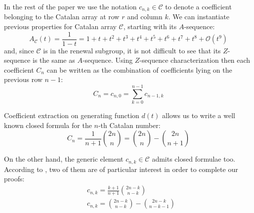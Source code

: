 In the rest of the paper we use the notation $c_{n,k}\in\mathcal{C}$ to denote
a coefficient belonging to the Catalan array at row $r$ and column $k$.
We can instantiate previous properties for Catalan array $\mathcal{C}$, starting with its $A$-sequence:
\begin{displaymath}
    A_{\mathcal{C}}(t)=\frac{1}{1-t}=1+t+t^{2}+t^{3}+t^{4}+t^{5}+t^{6}+t^{7}+t^{8}+
        \mathcal{O}(t^{9})
\end{displaymath}
and, since $\mathcal{C}$ is in the renewal subgroup, it is not difficult to see that its
$Z$-sequence is the same as $A$-sequence. Using $Z$-sequence characterization then 
each coefficient $C_{n}$ can be written as the combination of coefficients 
lying on the previous row $n-1$:
\begin{displaymath}
    C_{n} = c_{n,0} = \sum_{k=0}^{n-1}{c_{n-1,k}}
\end{displaymath}
\iffalse
in other words, $C_{n}$ equals the $(n-1)$-row sum of $\mathcal{C}$, 
therefore by the fundamental theorem:
\begin{displaymath}
    C_{n} = [t^{n-1}]\mathcal{C}\,A_{\mathcal{C}}(t)
          = [t^{n-1}]d(t)\,A_{\mathcal{C}}(h(t))
          = [t^{n}]h(t)\,A_{\mathcal{C}}(h(t))
\end{displaymath}
yielding:
\begin{displaymath}
    C_{n} = [t^{n}]\frac{1-\sqrt{1-4 \, t}}{1+\sqrt{1-4 \, t}}
\end{displaymath}
for $n>0$ and boundary condition $C_{0}=1$. 
Moreover, from the above equation, it is possible to derive
another generating function for the sequence of Catalan numbers:
\begin{displaymath}
    \frac{1-\sqrt{1-4 \, t}}{1+\sqrt{1-4 \, t}}=
    \frac{\left(1-\sqrt{1-4 \, t}\right)^{2}}{4 \, t}=
    \frac{1-2\,t-\sqrt{1-4 \, t}}{2 \, t}
\end{displaymath}
\fi
Coefficient extraction on generating function $d(t)$ allows us to write 
a well known closed formula for the $n$-th Catalan number:
\begin{equation}
    C_{n} = \frac{1}{n+1}{{2n}\choose{n}} 
        = {{2n}\choose{n}} - {{2n}\choose{n+1}}
    \label{eq:catalan:coeff:rewriting}
\end{equation}

On the other hand, the generic element $c_{n,k}\in\mathcal{C}$ 
admits closed formulae too. According to
\cite{luzon:2012631}, two of them are of
particular interest in order to complete our proofs:
\begin{align}
    & c_{n,k}=\frac{k+1}{n+1}{{2n-k}\choose{n-k}}
    \label{eq:catalan:array:first:identity}\\
    & c_{n,k}={{2n-k}\choose{n-k}} - {{2n-k}\choose{n-k-1}}
    \label{eq:catalan:array:second:identity}
\end{align}


